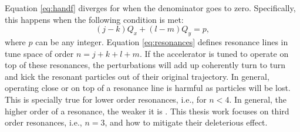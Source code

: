 Equation \ref{eq:handf} diverges for when the denominator goes to zero. Specifically, this happens when the following condition is met:
\begin{equation}
    \label{eq:resonances}
    \left( j-k \right) Q_x + \left( l-m\right) Q_y = p,
\end{equation}
where $p$ can be any integer. Equation \ref{eq:resonances} defines resonance lines in tune space of order $n=j+k+l+m$. If the accelerator is tuned to operate on top of these resonances, the perturbations will add up coherently turn to turn and kick the resonant particles out of their original trajectory. In general, operating close or on top of a resonance line is harmful as particles will be lost. This is specially true for lower order resonances, i.e., for $n<4$. In general, the higher order of a resonance, the weaker it is \cite{Wiedemann2015}. This thesis work focuses on third order resonances, i.e., $n=3$, and how to mitigate their deleterious effect. 

